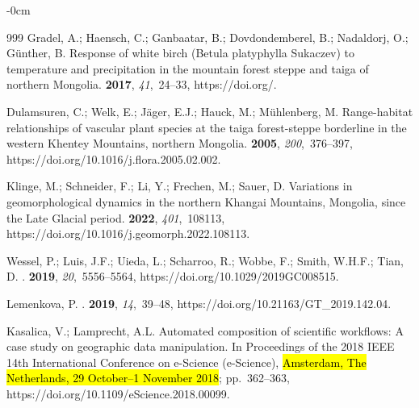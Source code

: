 \documentclass[geosciences,article,accept,pdftex,oneauthor]{Definitions/mdpi}
\begin{document}
\begin{adjustwidth}{-\extralength}{0cm}
\begin{thebibliography}{999}
Gradel, A.; Haensch, C.; Ganbaatar, B.; Dovdondemberel, B.; Nadaldorj, O.;
  Günther, B.
\newblock Response of white birch (Betula platyphylla Sukaczev) to temperature
  and precipitation in the mountain forest steppe and taiga of northern
  Mongolia.
 {\bf 2017}, {\em 41},~24--33,
  https://doi.org/{\href{https://doi.org/10.1016/j.dendro.2016.03.005}{}}.

Dulamsuren, C.; Welk, E.; Jäger, E.J.; Hauck, M.; Mühlenberg, M.
\newblock Range-habitat relationships of vascular plant species at the taiga
  forest-steppe borderline in the western Khentey Mountains, northern Mongolia.
  {\bf 2005}, {\em 200},~376--397, https://doi.org/10.1016/j.flora.2005.02.002.

Klinge, M.; Schneider, F.; Li, Y.; Frechen, M.; Sauer, D.
\newblock Variations in geomorphological dynamics in the northern Khangai
  Mountains, Mongolia, since the Late Glacial period.
 {\bf 2022}, {\em 401},~108113, https://doi.org/10.1016/j.geomorph.2022.108113.

Wessel, P.; Luis, J.F.; Uieda, L.; Scharroo, R.; Wobbe, F.; Smith, W.H.F.;
  Tian, D.
.
 {\bf 2019}, {\em
  20},~5556--5564, https://doi.org/10.1029/2019GC008515.

Lemenkova, P.
.
 {\bf 2019}, {\em 14},~39--48, https://doi.org/10.21163/GT\_2019.142.04.

Kasalica, V.; Lamprecht, A.L.
\newblock Automated composition of scientific workflows: A case study on
  geographic data manipulation.
\newblock In Proceedings of the 2018 IEEE 14th International Conference on
  e-Science (e-Science), \hl{Amsterdam, The Netherlands,  29 October--1 November 2018}; pp.~362--363, https://doi.org/10.1109/eScience.2018.00099.


\end{thebibliography}
\end{adjustwidth}
\end{document}
